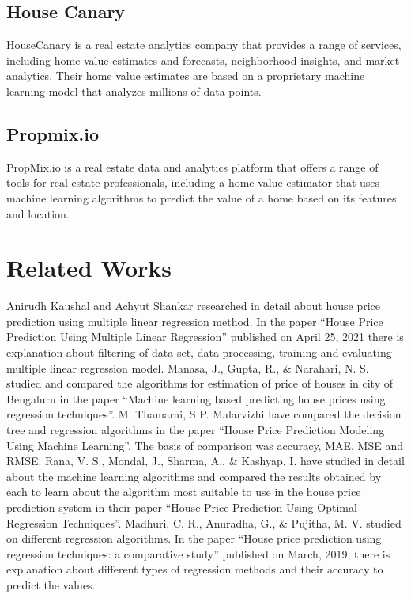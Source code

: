 \subsection{House Canary}
\vspace{-18pt}
HouseCanary is a real estate analytics company that provides a range of services, including home value estimates and forecasts, neighborhood insights, and market analytics. Their home value estimates are based on a proprietary machine learning model that analyzes millions of data points.
\vspace{-10pt}
\subsection{Propmix.io}
\vspace{-18pt}
PropMix.io is a real estate data and analytics platform that offers a range of tools for real estate professionals, including a home value estimator that uses machine learning algorithms to predict the value of a home based on its features and location.
\vspace{-10pt}
\section{Related Works}
Anirudh Kaushal and Achyut Shankar researched in detail about house price prediction using multiple linear regression method. In the paper “House Price Prediction Using Multiple Linear Regression” published on April 25, 2021 there is explanation about filtering of data set, data processing, training and evaluating multiple linear regression model. \cite{kaushal2021house} Manasa, J., Gupta, R., \& Narahari, N. S. studied and compared the algorithms for estimation of price of houses in city of Bengaluru in the paper “Machine learning based predicting house prices using regression techniques”. \cite{manasa2020machine} M. Thamarai, S P. Malarvizhi have compared the decision tree and regression algorithms in the paper “House Price Prediction Modeling Using Machine Learning”. The basis of comparison was accuracy, MAE, MSE and RMSE. \cite{thamarai2020house} Rana, V. S., Mondal, J., Sharma, A., \& Kashyap, I. have studied in detail about the machine learning algorithms and compared the results obtained by each to learn about the algorithm most suitable to use in the house price prediction system in their paper “House Price Prediction Using Optimal Regression Techniques”.\cite{Rana2020HousePP} Madhuri, C. R., Anuradha, G., \& Pujitha, M. V. studied on different regression algorithms. In the paper “House price prediction using regression techniques: a comparative study” published on March, 2019, there is explanation about different types of regression methods and their accuracy to predict the values. \cite{madhuri2019house}
